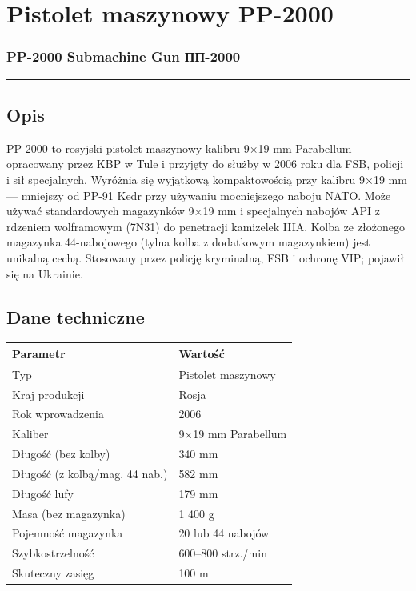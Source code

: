 \documentclass[12pt,openany,oneside]{book}
\begin{document}
\chapter{Pistolet maszynowy PP-2000}\label{pistolet-maszynowy-pp-2000}

\subsection{PP-2000 Submachine Gun \textbar{}
ПП-2000}\label{pp-2000-submachine-gun-ux43fux43f-2000}

\begin{center}\rule{0.5\linewidth}{0.5pt}\end{center}

\section{Opis}\label{opis-97}

PP-2000 to rosyjski pistolet maszynowy kalibru 9×19 mm Parabellum
opracowany przez KBP w Tule i przyjęty do służby w 2006 roku dla FSB,
policji i sił specjalnych. Wyróżnia się wyjątkową kompaktowością przy
kalibru 9×19 mm --- mniejszy od PP-91 Kedr przy używaniu mocniejszego
naboju NATO. Może używać standardowych magazynków 9×19 mm i specjalnych
nabojów API z rdzeniem wolframowym (7N31) do penetracji kamizelek IIIA.
Kolba ze złożonego magazynka 44-nabojowego (tylna kolba z dodatkowym
magazynkiem) jest unikalną cechą. Stosowany przez policję kryminalną,
FSB i ochronę VIP; pojawił się na Ukrainie.

\section{Dane techniczne}\label{dane-techniczne-97}

\begin{longtable}[]{@{}ll@{}}
\toprule\noalign{}
Parametr & Wartość \\
\midrule\noalign{}
\endhead
\bottomrule\noalign{}
\endlastfoot
Typ & Pistolet maszynowy \\
Kraj produkcji & Rosja \\
Rok wprowadzenia & 2006 \\
Kaliber & 9×19 mm Parabellum \\
Długość (bez kolby) & 340 mm \\
Długość (z kolbą/mag. 44 nab.) & 582 mm \\
Długość lufy & 179 mm \\
Masa (bez magazynka) & 1 400 g \\
Pojemność magazynka & 20 lub 44 nabojów \\
Szybkostrzelność & 600--800 strz./min \\
Skuteczny zasięg & 100 m \\
\end{longtable}
\end{document}
